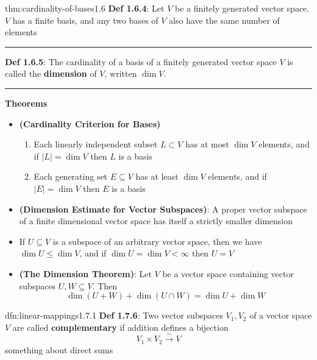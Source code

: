 \documentclass[landscape, 8pt]{extarticle}
\begin{document}
\begin{multicols}{3}
\begin{thm}{thm:cardinality-of-bases}{1.6}
    \textbf{Def 1.6.4}: Let $V$ be a finitely generated vector space. $V$ has a finite basis, and any two bases of $V$ also have the same number of elements

    \vspace{-5pt}
    \noindent\rule{\textwidth}{0.2pt}
    \textbf{Def 1.6.5}: The cardinality of a basis of a finitely generated vector space $V$ is called the \textbf{dimension} of $V$, written $\dim V$. 

    \vspace{-5pt}
    \noindent\rule{\textwidth}{0.2pt}


    \textbf{Theorems}
    \begin{itemize}
        \setlength\itemsep{0em}
        \item[\textbf{1.6.7}] \textbf{(Cardinality Criterion for Bases)}
        \vspace{-5pt}
        \begin{enumerate}
            \setlength\itemsep{0em}
            \item Each linearly independent subset $L \subset V$ has at most $\dim V$ elements, and if $\lvert L \rvert = \dim V$ then $L$ is a basis
            \vspace{-3pt}
            \item Each generating set $E \subseteq V$ has at least $\dim V$ elements, and if $\lvert E \rvert = \dim V$ then $E$ is a basis
        \end{enumerate}
        \item[\textbf{1.6.8}] \textbf{(Dimension Estimate for Vector Subspaces)}: A proper vector subspace of a finite dimensional vector space has itself a strictly smaller dimension

        \item[\textbf{1.6.9}] If $U \subseteq V$ is a subspace of an arbitrary vector space, then we have $\dim U \le \dim V$, and if $\dim U = \dim V < \infty$ then $U = V$
        \item[\textbf{1.6.10}] \textbf{(The Dimension Theorem)}: Let $V$ be a vector space containing vector subspaces $U,W\subseteq V$. Then
        \[\dim(U + W) + \dim(U \cap W) = \dim U + \dim W\]
    \end{itemize}
\end{thm}

\begin{dfn}{dfn:linear-mappings}{1.7.1}
    \textbf{Def 1.7.6}: Two vector subspaces $V_{1}, V_{2}$ of a vector space $V$ are called \textbf{complementary} if addition defines a bijection
    \[V_{1} \times V_{2} \xrightarrow{\sim} V\]
    something about direct sums


\end{dfn}
\end{multicols}
\end{document}
